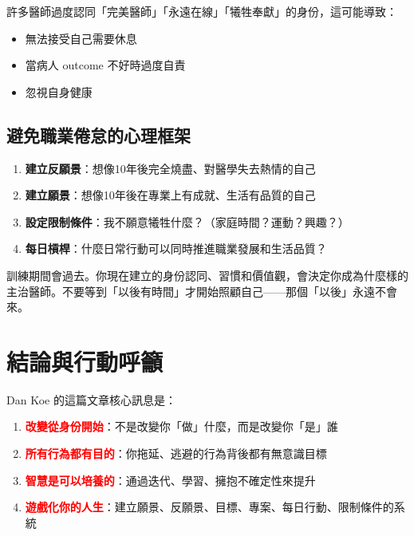\documentclass[12pt,a4paper]{article}
\begin{document}
許多醫師過度認同「完美醫師」「永遠在線」「犧牲奉獻」的身份，這可能導致：
\begin{itemize}
    \item 無法接受自己需要休息
    \item 當病人 outcome 不好時過度自責
    \item 忽視自身健康
\end{itemize}


\subsection{避免職業倦怠的心理框架}

\begin{enumerate}
    \item \textbf{建立反願景}：想像10年後完全燒盡、對醫學失去熱情的自己
    \item \textbf{建立願景}：想像10年後在專業上有成就、生活有品質的自己
    \item \textbf{設定限制條件}：我不願意犧牲什麼？（家庭時間？運動？興趣？）
    \item \textbf{每日槓桿}：什麼日常行動可以同時推進職業發展和生活品質？
\end{enumerate}

\begin{tcolorbox}[colback=yellow!10!white,colframe=orange!75!black,title=\textbf{給住院醫師的提醒}]
訓練期間會過去。你現在建立的身份認同、習慣和價值觀，會決定你成為什麼樣的主治醫師。不要等到「以後有時間」才開始照顧自己——那個「以後」永遠不會來。
\end{tcolorbox}

\section{結論與行動呼籲}

Dan Koe 的這篇文章核心訊息是：

\begin{enumerate}
    \item \textcolor{red}{\textbf{改變從身份開始}}：不是改變你「做」什麼，而是改變你「是」誰
    \item \textcolor{red}{\textbf{所有行為都有目的}}：你拖延、逃避的行為背後都有無意識目標
    \item \textcolor{red}{\textbf{智慧是可以培養的}}：通過迭代、學習、擁抱不確定性來提升
    \item \textcolor{red}{\textbf{遊戲化你的人生}}：建立願景、反願景、目標、專案、每日行動、限制條件的系統
\end{enumerate}
\end{document}
